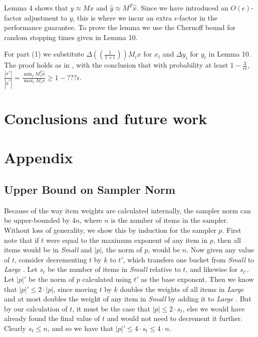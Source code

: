 \documentclass[11pt]{article}
\newcommand{\xhat}{\hat{x}}
\newcommand{\yhat}{\hat{y}}
\newcommand{\sizeof}[1]{|#1|}
\newcommand{\smallset}{\emph{Small }}
\newcommand{\largeset}{\emph{Large }}
\newcommand{\epsDown}{\left( \frac{1}{1+\epsilon} \right) }
\begin{document}
Lemma 4 shows that $y \approx Mx$ and $\yhat \approx M^T\xhat$.  Since we have
introduced an $O(\epsilon)$-factor adjustment to $y$, this is where we
incur an extra $\epsilon$-factor in the performance guarantee. To prove the
lemma we use the Chernoff bound for random stopping times given in
Lemma 10.

For part (1) we substitute $\Delta (\epsDown)M_i x$ for $x_t$ and 
$\Delta y_i$ for $y_t$ in Lemma 10.  The proof holds as in \cite{kouf2007}, with the conclusion that with probability at least $1-\frac{3}{rc}$, 
$\frac{\sizeof{x^*}}{\sizeof{\xhat ^*}} = \frac{\min_jM_J^T\xhat}{\max_iM_ix}
\geq 1-???\epsilon$. 

\section{Conclusions and future work} \label{sec:conclusion} 

\section{Appendix}
\subsection{Upper Bound on Sampler Norm}\label{sec:normProof}
Because of the way item weights are calculated internally, the sampler norm can be
upper-bounded by $4n$, where $n$ is the number of items
in the sampler.  Without loss of generality, we show this by induction for the
sampler $p$.  First note that if $t$ were equal to
the maximum
exponent of any item in $p$, then all items would be in \smallset
and $\sizeof{p}$, the norm of $p$, would be $n$.  Now given any value of
$t$, consider decrementing
$t$ by $k$ to $t'$, which transfers one bucket from \smallset to \largeset.
Let  $s_{t}$ be the number of items in \smallset relative to $t$,
and likewise for $s_{t'}$. Let $\sizeof{p}'$ be the norm of $p$ calculated
using $t'$ as the base exponent. Then we know that 
$\sizeof{p}' \le 2 \cdot \sizeof{p}$, since moving $t$ by $k$ doubles the
weights of all items in \largeset and at most doubles the weight of any
item in \smallset by adding it to \largeset.  But by our calculation of
$t$, it must be the case that $\sizeof{p} \le 2 \cdot s_{t}$, else we
would have already found the final value of $t$ and would not need to
decrement it further.  Clearly $s_{t} \le n$, and so we have that 
$\sizeof{p}' \le 4 \cdot s_{t} \le 4 \cdot n$.  
\end{document}
